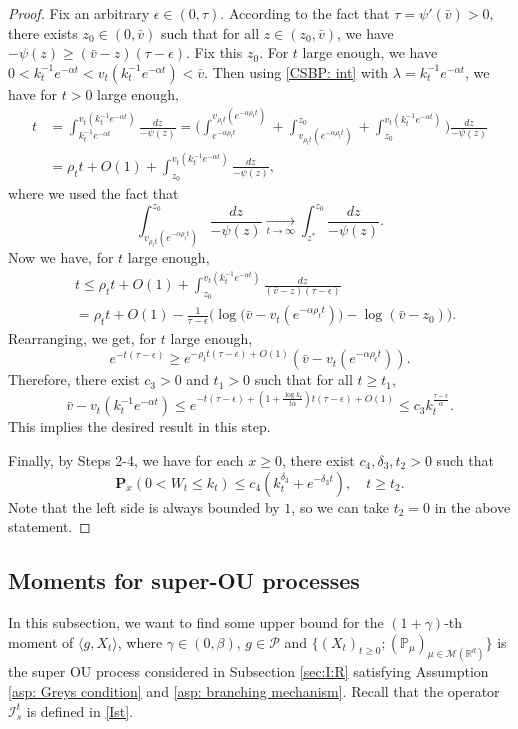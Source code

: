 \documentclass[12pt,a4paper]{amsart}
\theoremstyle{plain}
\theoremstyle{definition}
\numberwithin{equation}{section}
\begin{document}
\begin{proof}
Fix an arbitrary $\epsilon \in (0,\tau)$.
According to the fact that $\tau=\psi'(\bar v)>0$, there exists $z_0 \in (0,\bar v)$ such that for all $z\in (z_0, \bar v)$, we have $-\psi(z)\geq (\bar v - z)(\tau- \epsilon)$.     
Fix this $z_0$.
For $t$ large enough, we have $0<k_t^{-1}e^{-\alpha t} < v_t(k_t^{-1}e^{-\alpha t})< \bar v$.
Then using \eqref{CSBP: int} with $\lambda=k_t^{-1} e^{-\alpha t}$, we have for $t>0$ large enough,
\begin{align}
  t 
  & =\int^{v_t(k_t^{-1} e^{-\alpha t})}_{k_t^{-1} e^{-\alpha t}}\frac{dz}{-\psi(z)}
    = \Big(\int^{v_{\rho_t t}(e^{-\alpha \rho_t t})}_{e^{-\alpha \rho_t t}}  + \int^{z_0}_{v_{\rho_t t}(e^{-\alpha \rho_t t})} +\int^{v_t(k_t^{-1}e^{-\alpha  t})}_{z_0}\Big)\frac{dz}{-\psi(z)} \\
  & = \rho_t t + O(1) +\int^{v_t(k_t^{-1}e^{-\alpha t})}_{z_0} \frac{dz}{-\psi(z)},
\end{align}
where we used the fact that
\[
  \int_{v_{\rho_t t}(e^{-\alpha \rho_tt})}^{z_0} \frac{dz}{-\psi(z)} 
  \xrightarrow[t\to \infty] {} \int_{z^*}^{z_0} \frac{dz}{-\psi(z)}.
\]
Now we have, for $t$ large enough,
\begin{align}
  & t 
    \leq  \rho_t t + O(1) + \int_{z_0}^{v_t(k_t^{-1}e^{-\alpha t})} \frac{dz}{(\bar v-z)(\tau - \epsilon)} \\
  & =  \rho_t t +O(1)- \frac{1}{\tau-\epsilon}\Big( \log \big(\bar v-v_t(e^{-\alpha \rho_t t})\big) - \log(\bar v-z_0)\Big).
\end{align}
Rearranging, we get, for $t$ large enough,
\[
  e^{-t(\tau - \epsilon)} 
  \geq e^{-\rho_t t(\tau - \epsilon)+O(1)}(\bar v - v_t(e^{-\alpha \rho_t t})).
\]
Therefore, there exist $c_3>0$ and $t_1>0$ such that for all $t\geq t_1$,
\[
  \bar v - v_t(k_t^{-1} e^{-\alpha t}) 
  \leq e^{-t(\tau -\epsilon)+ (1+\frac{\log k_t}{t\alpha})t(\tau - \epsilon)+O(1)}
  \leq c_3k_t^{\frac{\tau - \epsilon}{\alpha}}.
\]
This implies the desired result in this step.

Finally, by Steps 2-4, we have for each $x\geq 0$, there exist $c_4, \delta_3, t_2 > 0$ such that
\[
  \mathbf P_{x}(0< W_t\leq k_t) 
  \leq c_4(k_t^{\delta_3}+e^{-\delta_3 t})
  , \quad t\geq t_2.
\]
Note that the left side is always bounded by $1$, so we can take $t_2 =0$ in the above statement.
\end{proof}

\subsection{Moments for super-OU processes}
\label{sec: Moments for super-OU processes}
In this subsection,  we want to find some upper bound for the $(1+\gamma)$-th moment of $\langle g ,X_t \rangle$, where $\gamma \in (0,\beta)$, $g\in \mathcal P$ and $\{(X_t)_{t\geq 0}; (\mathbb P_\mu)_{\mu \in \mathcal M(\mathbb R^d)}\}$ is the super OU process considered in Subsection \ref{sec:I:R} satisfying Assumption \ref{asp: Greys condition} and \ref{asp: branching mechanism}.
Recall that the operator $\mathcal{I}^t_s$ is defined in \eqref{Ist}.
\end{document}
